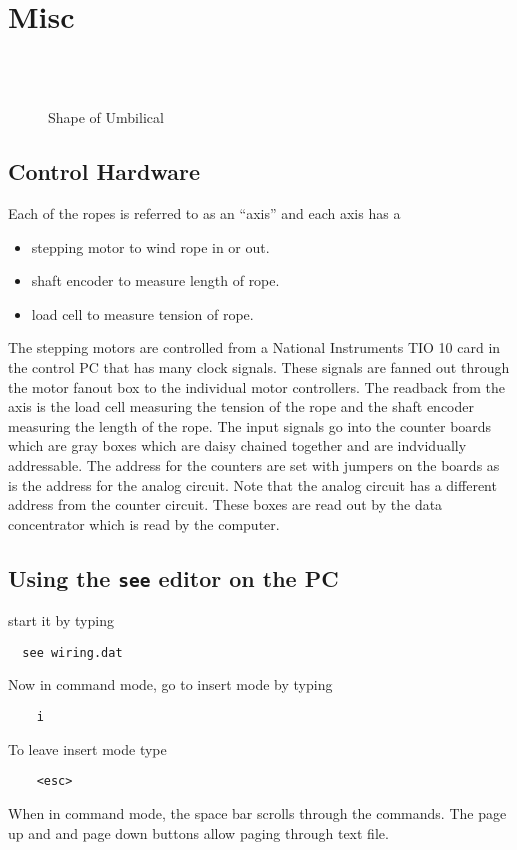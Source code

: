   
\chapter{Misc}
  

   
\begin{figure}
\begin{center}
\leavevmode
\epsfxsize=5in
~\\\
\caption[Shape of Umbilical]
        {Shape of Umbilical
        }
\end{center}
\end{figure} 
  
\section{Control Hardware}
  
  
  Each of the ropes is referred to as an ``axis'' and each axis has a
\begin{itemize}
\item stepping motor to wind rope in or out.
\item shaft encoder to measure length of rope.
\item load cell to measure tension of rope.
\end{itemize}
The stepping motors are controlled from a National Instruments TIO 10 card
in the control PC that has many clock signals.  These signals are fanned
out through the motor fanout box to the individual motor controllers.
The readback from the axis is the load cell measuring the tension of the
rope and the shaft encoder measuring the length of the rope.  The input
signals go into the counter boards which are gray boxes 
which are daisy chained together and are indvidually 
addressable.    The address for the counters are set with jumpers on 
the boards as is the address for the analog circuit.  Note that the
analog circuit has a different address from the counter circuit.
These boxes are read out by the data concentrator which is
read by the computer.

\section{Using the {\tt see} editor on the PC}
start it by typing
\begin{verbatim}
  see wiring.dat
\end{verbatim}
Now in command mode, go to insert mode by typing 
\begin{verbatim}
    i
\end{verbatim}
To leave insert mode type 
\begin{verbatim}
    <esc>
\end{verbatim}
When in command mode, the space bar scrolls through the commands.  The
page up and and page down buttons allow paging through text file.
